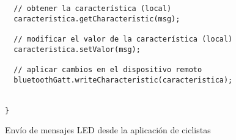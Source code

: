 \begin{description}
\begin{listing}
\begin{minipage}{.4\textwidth}
\begin{verbatim}
  // obtener la característica (local)
  caracteristica.getCharacteristic(msg);
  
  // modificar el valor de la característica (local)
  caracteristica.setValor(msg);
  
  // aplicar cambios en el dispositivo remoto
  bluetoothGatt.writeCharacteristic(caracteristica);
  
	
}				
				\end{verbatim}
			\end{minipage}
		\caption{Envío de mensajes LED desde la aplicación de ciclistas}\label{alg:appciclistasBLE}
	\end{listing}
\end{description}
